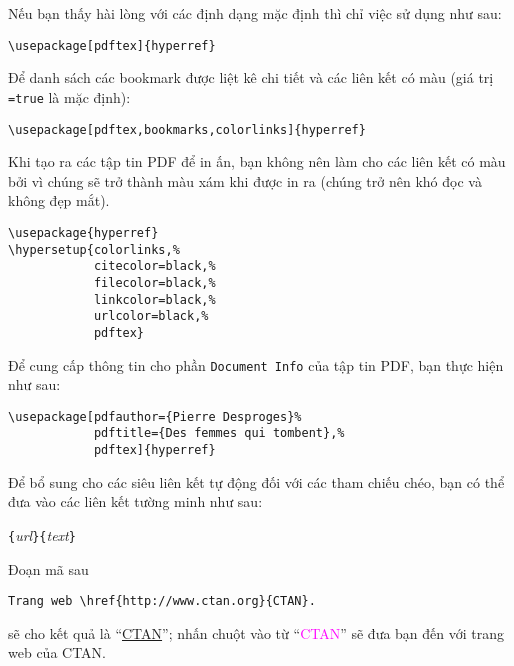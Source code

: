 \vspace{\baselineskip}

Nếu bạn thấy hài lòng với các định dạng mặc định thì chỉ việc sử
dụng như sau:
\begin{code}
\begin{verbatim}
\usepackage[pdftex]{hyperref}
\end{verbatim}
\end{code}

Để danh sách các bookmark được liệt kê chi tiết và các liên kết có
màu (giá trị \texttt{=true} là mặc định):
\begin{code}
\begin{verbatim}
\usepackage[pdftex,bookmarks,colorlinks]{hyperref}
\end{verbatim}
\end{code}

Khi tạo ra các tập tin PDF để in ấn, bạn không nên làm cho các liên kết có màu bởi vì chúng sẽ trở thành màu xám
khi được in ra (chúng trở nên khó đọc và không đẹp mắt).
\begin{code}
\begin{verbatim}
\usepackage{hyperref}
\hypersetup{colorlinks,%
            citecolor=black,%
            filecolor=black,%
            linkcolor=black,%
            urlcolor=black,%
            pdftex}
\end{verbatim}
\end{code}

Để cung cấp thông tin cho phần \texttt{Document Info} của tập tin PDF, bạn thực hiện như sau:
\begin{code}
\begin{verbatim}
\usepackage[pdfauthor={Pierre Desproges}%
            pdftitle={Des femmes qui tombent},%
            pdftex]{hyperref}
\end{verbatim}
\end{code}

\vspace{\baselineskip}

Để bổ sung cho các siêu liên kết tự động đối với các tham chiếu chéo, bạn có thể đưa vào các liên kết tường minh như sau:
\begin{lscommand}
\verb|{|\emph{url}\verb|}{|\emph{text}\verb|}|
\end{lscommand}

Đoạn mã sau
\begin{code}
\begin{verbatim}
Trang web \href{http://www.ctan.org}{CTAN}.
\end{verbatim}
\end{code}
sẽ cho kết quả là ``\href{http://www.ctan.org}{CTAN}''; nhấn chuột vào từ ``\textcolor{magenta}{CTAN}'' sẽ đưa bạn đến với trang web của CTAN.

